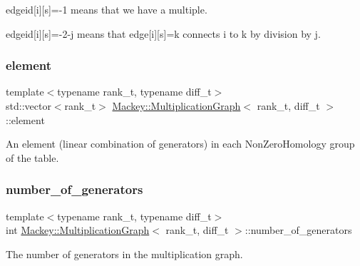 edgeid\mbox{[}i\mbox{]}\mbox{[}s\mbox{]}=-\/1 means that we have a multiple.

edgeid\mbox{[}i\mbox{]}\mbox{[}s\mbox{]}=-\/2-\/j means that edge\mbox{[}i\mbox{]}\mbox{[}s\mbox{]}=k connects i to k by division by j. \mbox{\label{classMackey_1_1MultiplicationGraph_a53fe65317d8cef485a93e3e516dd374f}} 
\subsubsection{\texorpdfstring{element}{element}}
{\footnotesize\ttfamily template$<$typename rank\+\_\+t, typename diff\+\_\+t$>$ \\
std\+::vector$<$rank\+\_\+t$>$ \hyperlink{classMackey_1_1MultiplicationGraph}{Mackey\+::\+Multiplication\+Graph}$<$ rank\+\_\+t, diff\+\_\+t $>$\+::element\hspace{0.3cm}{\ttfamily [protected]}}



An element (linear combination of generators) in each Non\+Zero\+Homology group of the table. 

\mbox{\label{classMackey_1_1MultiplicationGraph_a9fd088a706e8c2ffeae3db1584de9266}} 
\subsubsection{\texorpdfstring{number\+\_\+of\+\_\+generators}{number\_of\_generators}}
{\footnotesize\ttfamily template$<$typename rank\+\_\+t, typename diff\+\_\+t$>$ \\
int \hyperlink{classMackey_1_1MultiplicationGraph}{Mackey\+::\+Multiplication\+Graph}$<$ rank\+\_\+t, diff\+\_\+t $>$\+::number\+\_\+of\+\_\+generators}



The number of generators in the multiplication graph. 

\mbox{\label{classMackey_1_1MultiplicationGraph_ac831b81d1936c4dd2202dabaa8e4e2fb}} 
